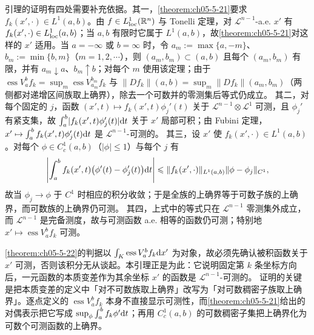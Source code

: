 \documentclass[../../main.tex]{subfiles}%
\begin{document}
引理的证明有四处需要补充依据。其一，\cref{theorem:ch05-5-21}要求 $f_k(x',\cdot)\in L^1(a,b)$。由 $f\in L^1_{\mathrm{loc}}(\mathbb{R}^n)$ 与 Tonelli 定理，对 $\mathcal{L}^{n-1}$-a.e. $x'$ 有 $f_k(x',\cdot)\in L^1_{\mathrm{loc}}(a,b)$；当 $a,b$ 有限时它属于 $L^1(a,b)$，故\cref{theorem:ch05-5-21}对这样的 $x'$ 适用。当 $a=-\infty$ 或 $b=\infty$ 时，令 $a_m:=\max\{a,-m\}$、$b_m:=\min\{b,m\}$（$m=1,2,\cdots$），则 $(a_m,b_m)\subset(a,b)$ 且每个 $(a_m,b_m)$ 有限，并有 $a_m\downarrow a$、$b_m\uparrow b$；对每个 $m$ 使用该定理；由于 $\operatorname{ess}V_a^b f_k=\sup_m\operatorname{ess}V_{a_m}^{b_m}f_k$ 与 $\lVert Df_k\rVert(a,b)=\sup_m\lVert Df_k\rVert(a_m,b_m)$（两侧都对递增区间族取上确界），除去一个可数并的零测集后等式仍成立。%
其二，对每个固定的 $j$，函数 $(x',t)\mapsto f_k(x',t)\phi_j'(t)$ 关于 $\mathcal{L}^{n-1}\otimes\mathcal{L}^1$ 可测，且 $\phi_j'$ 有紧支集，故 $\int_a^b\lvert f_k(x',t)\phi_j'(t)\rvert\mathrm{d} t$ 关于 $x'$ 局部可积；由 Fubini 定理，$x'\mapsto\int_a^b f_k(x',t)\phi_j'(t)\mathrm{d} t$ 是 $\mathcal{L}^{n-1}$-可测的。
其三，设 $x'$ 使 $f_k(x',\cdot)\in L^1(a,b)$。对每个 $\phi\in C_c^1(a,b)$（$\lvert\phi\rvert\leqslant1$）与每个 $j$ 有
\begin{align*}
\left\lvert\int_a^b f_k(x',t)\bigl(\phi'(t)-\phi_j'(t)\bigr)\mathrm{d} t\right\rvert\leqslant\lVert f_k(x',\cdot)\rVert_{L^1(a,b)}\lVert\phi-\phi_j\rVert_{C^1},
\end{align*}
故当 $\phi_j\to\phi$ 于 $C^1$ 时相应的积分收敛；于是全族的上确界等于可数子族的上确界，而可数族的上确界仍可测。
其四，上式中的等式只在 $\mathcal{L}^{n-1}$ 零测集外成立，而 $\mathcal{L}^{n-1}$ 是完备测度，故与可测函数 a.e. 相等的函数仍可测；特别地 $x'\mapsto\operatorname{ess}V_a^b f_k$ 可测。

\begin{remark}\label{remark:ch05-lem-5-7-动机}
\cref{theorem:ch05-5-22}的判据以 $\int_K\operatorname{ess}V_a^b f_k\mathrm{d} x'$ 为对象，故必须先确认被积函数关于 $x'$ 可测，否则该积分无从谈起。本引理正是为此：它说明固定第 $k$ 条坐标方向后，一元函数的本质变差作为其余坐标 $x'$ 的函数是 $\mathcal{L}^{n-1}$-可测的。%
证明的关键是把本质变差的定义中「对不可数族取上确界」改写为「对可数稠密子族取上确界」。逐点定义的 $\operatorname{ess}V_a^b f_k$ 本身不直接显示可测性，而\cref{theorem:ch05-5-21}给出的对偶表示把它写成 $\sup_\phi\int_a^b f_k\phi'\mathrm{d} t$；再用 $C_c^1(a,b)$ 的可数稠密子集把上确界化为可数个可测函数的上确界。%
\end{remark}
\end{document}
